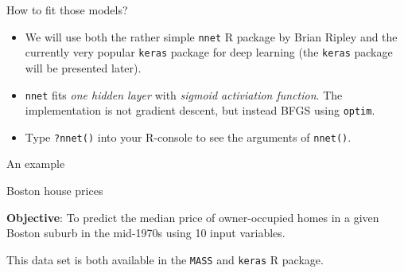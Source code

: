 \documentclass[
  10pt,
  ignorenonframetext,
  twocolumn]{beamer}
\providecommand{\tightlist}{%
  \setlength{\itemsep}{0pt}\setlength{\parskip}{0pt}}
\begin{document}
\begin{frame}[fragile]
\begin{block}{How to fit those models?}
\label{how-to-fit-those-models}
\(~\)

\begin{itemize}
\item
  We will use both the rather simple \texttt{nnet} R package by Brian
  Ripley and the currently very popular \texttt{keras} package for deep
  learning (the \texttt{keras} package will be presented later).
  \vspace{2mm}
\item
  \texttt{nnet} fits \emph{one hidden layer} with \emph{sigmoid
  activiation function}. The implementation is not gradient descent, but
  instead BFGS using \texttt{optim}. \vspace{2mm}
\end{itemize}

\begin{itemize}
\tightlist
\item
  Type \texttt{?nnet()} into your R-console to see the arguments of
  \texttt{nnet()}.
\end{itemize}

\vspace{2mm}
\end{block}
\end{frame}

\begin{frame}[fragile]{An example}
\label{an-example}
\begin{block}{Boston house prices}
\label{boston-house-prices}
\vspace{2mm}

\textbf{Objective}: To predict the median price of owner-occupied homes
in a given Boston suburb in the mid-1970s using 10 input variables.

This data set is both available in the \texttt{MASS} and \texttt{keras}
R package.

\(~\)
\end{block}
\end{frame}
\end{document}
